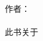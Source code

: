 \begin{titlepage}
  \raggedleft
  {\Large 作者：\\ \pdfauthor\\[1in]}    
  {\large 此书关于\\}
  {\Huge\scshape \bookname\\[.2in]}      
  {\large \bookoneword\\}    
  \vfill
  {\itshape \timeandcompany} 
\end{titlepage}